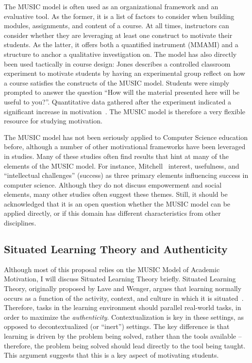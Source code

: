 The MUSIC model is often used as an organizational framework and an evaluative tool.
As the former, it is a list of factors to consider when building modules, assignments, and content of a course.
At all times, instructors can consider whether they are leveraging at least one construct to motivate their students.
As the latter, it offers both a quantified instrument (MMAMI) and a structure to anchor a qualitative investigation on.
The model has also directly been used tactically in course design: Jones describes a controlled classroom experiment to motivate students by having an experimental group reflect on how a course satisfies the constructs of the MUSIC model. Students were simply prompted to answer the question ``How will the material presented here will be useful to you?''.
Quantitative data gathered after the experiment indicated a significant increase in motivation~\cite{mcginley2014brief}.
The MUSIC model is therefore a very flexible resource for studying motivation.

The MUSIC model has not been seriously applied to Computer Science education before, although a number of other motivational frameworks have been leveraged in studies.
Many of these studies often find results that hint at many of the elements of the MUSIC model.
For instance, Mitchell~\cite{Mitchell:2000} interest, usefulness, and ``intellectual challenges'' (success) as three primary elements influencing success in computer science.
Although they do not discuss empowerment and social elements, many other studies often suggest these themes.
Still, it should be acknowledged that it is an open question whether the MUSIC model can be applied directly, or if this domain has different characteristics from other disciplines.

\subsection{Situated Learning Theory and Authenticity}

Although most of this proposal relies on the MUSIC Model of Academic Motivation, I will discuss Situated Learning Theory briefly.
Situated Learning Theory, originally proposed by Lave and Wenger, argues that learning normally occurs as a function of the activity, context, and culture in which it is situated~\cite{lave-situated}.
Therefore, tasks in the learning environment should parallel real-world tasks, in order to maximize the \textit{authenticity}.
Contextualization is key in these settings, as opposed to decontextualized (or ``inert'') settings.
The key difference is that learning is driven by the problem being solved, rather than the tools available – therefore, the problem being solved should lead directly to the tool being taught.
This argument suggests that this is a key aspect of motivating students.


